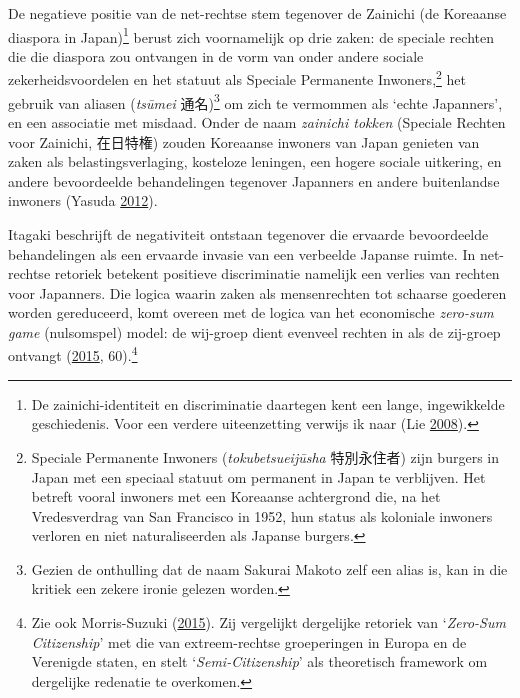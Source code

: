 \documentclass[10.5pt,dutch,]{article}
\begin{document}
De negatieve positie van de net-rechtse stem tegenover de Zainichi (de
Koreaanse diaspora in Japan)\footnote{De zainichi-identiteit en
  discriminatie daartegen kent een lange, ingewikkelde geschiedenis.
  Voor een verdere uiteenzetting verwijs ik naar (Lie
  \protect\hyperlink{ref-lieux5fzainichiux5f2008}{2008}).} berust zich
voornamelijk op drie zaken: de speciale rechten die die diaspora zou
ontvangen in de vorm van onder andere sociale zekerheidsvoordelen en het
statuut als Speciale Permanente Inwoners,\footnote{Speciale Permanente
  Inwoners (\emph{tokubetsueijūsha} 特別永住者) zijn burgers in Japan
  met een speciaal statuut om permanent in Japan te verblijven. Het
  betreft vooral inwoners met een Koreaanse achtergrond die, na het
  Vredesverdrag van San Francisco in 1952, hun status als koloniale
  inwoners verloren en niet naturaliseerden als Japanse burgers.} het
gebruik van aliasen (\emph{tsūmei} 通名)\footnote{Gezien de onthulling
  dat de naam Sakurai Makoto zelf een alias is, kan in die kritiek een
  zekere ironie gelezen worden.} om zich te vermommen als `echte
Japanners', en een associatie met misdaad. Onder de naam \emph{zainichi
tokken} (Speciale Rechten voor Zainichi, 在日特権) zouden Koreaanse
inwoners van Japan genieten van zaken als belastingsverlaging, kosteloze
leningen, een hogere sociale uitkering, en andere bevoordeelde
behandelingen tegenover Japanners en andere buitenlandse inwoners
(Yasuda \protect\hyperlink{ref-yasudaux5fnettoux5f2012}{2012}).

Itagaki beschrijft de negativiteit ontstaan tegenover die ervaarde
bevoordeelde behandelingen als een ervaarde invasie van een verbeelde
Japanse ruimte. In net-rechtse retoriek betekent positieve discriminatie
namelijk een verlies van rechten voor Japanners. Die logica waarin zaken
als mensenrechten tot schaarse goederen worden gereduceerd, komt overeen
met de logica van het economische \emph{zero-sum game} (nulsomspel)
model: de wij-groep dient evenveel rechten in als de zij-groep ontvangt
(\protect\hyperlink{ref-itagakiux5fanatomyux5f2015}{2015},
60).\footnote{Zie ook Morris-Suzuki
  (\protect\hyperlink{ref-morris-suzukiux5fbeyondux5f2015}{2015}). Zij
  vergelijkt dergelijke retoriek van `\emph{Zero-Sum Citizenship}' met
  die van extreem-rechtse groeperingen in Europa en de Verenigde staten,
  en stelt `\emph{Semi-Citizenship}' als theoretisch framework om
  dergelijke redenatie te overkomen.}
\end{document}
